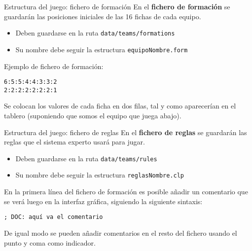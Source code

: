 \documentclass[smaller,spanish,xcolor=svgnames]{beamer}
\begin{document}
\begin{frame}[fragile]{Estructura del juego: fichero de formación}
  En el \textbf{fichero de formación} se guardarán las posiciones iniciales de
  las 16 fichas de cada equipo.
  \begin{itemize}
  \item Deben guardarse en la ruta \texttt{data/teams/formations}
  \item Su nombre debe seguir la estructura \texttt{equipoNombre.form}
  \end{itemize}

  \medskip

  Ejemplo de fichero de formación:

\begin{verbatim}
6:5:5:4:4:3:3:2
2:2:2:2:2:2:2:1
\end{verbatim}

\medskip

Se colocan los valores de cada ficha en dos filas, tal y como aparecerían en el
tablero (suponiendo que somos el equipo que juega abajo).
\end{frame}


\begin{frame}[fragile]{Estructura del juego: fichero de reglas}
  En el \textbf{fichero de reglas} se guardarán las reglas que el sistema
  experto usará para jugar.

  \begin{itemize}
  \item Deben guardarse en la ruta \texttt{data/teams/rules}
  \item Su nombre debe seguir la estructura \texttt{reglasNombre.clp}
  \end{itemize}

  \medskip

  En la primera línea del fichero de formación es posible añadir un comentario
  que se verá luego en la interfaz gráfica, siguiendo la siguiente sintaxis:

\begin{verbatim}
; DOC: aquí va el comentario
\end{verbatim}

\medskip

De igual modo se pueden añadir comentarios en el resto del fichero usando el
punto y coma como indicador.
\end{frame}
\end{document}
